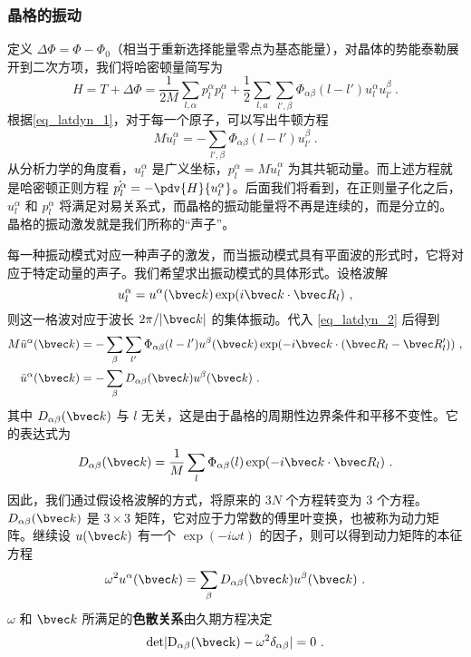 \subsubsection{晶格的振动}
定义 $\Delta \Phi=\Phi-\Phi_0$（相当于重新选择能量零点为基态能量），对晶体的势能泰勒展开到二次方项，我们将哈密顿量简写为
\begin{equation}
H=T+\Delta \Phi=\frac{1}{2M}\sum_{l,\alpha}p_l^\alpha p_l^\alpha + \frac{1}{2}\sum_{l,a}\sum_{l',\beta}\Phi_{\alpha\beta}(l-l')u_l^\alpha u_{l'}^\beta~.
\end{equation}
根据\autoref{eq_latdyn_1}，对于每一个原子，可以写出牛顿方程
\begin{equation}\label{eq_latdyn_2}
M \ddot{u}_l^\alpha = -\sum_{l',\beta}\Phi_{\alpha\beta}(l-l')u_{l'}^\beta~.
\end{equation}
从分析力学的角度看，$u_l^\alpha$ 是广义坐标，$p_l^\alpha=M\dot{u}_l^\alpha$ 为其共轭动量。而上述方程就是哈密顿正则方程 $\dot{p_l^\alpha}=-\pdv{H}{u_l^\alpha}$。后面我们将看到，在正则量子化之后，$u_l^\alpha$ 和 $p_l^\alpha$ 将满足对易关系式，而晶格的振动能量将不再是连续的，而是分立的。晶格的振动激发就是我们所称的“声子”。

每一种振动模式对应一种声子的激发，而当振动模式具有平面波的形式时，它将对应于特定动量的声子。我们希望求出振动模式的具体形式。设格波解
\begin{equation}
u_l^\alpha = u^\alpha(\bvec k) \exp(i\bvec k\cdot \bvec R_l)~,
\end{equation}
则这一格波对应于波长 $2\pi/|\bvec k|$ 的集体振动。代入 \autoref{eq_latdyn_2} 后得到
\begin{equation}
\begin{aligned}
M\ddot{u}^\alpha(\bvec k)&=-\sum_{\beta}\sum_{l'}\Phi_{\alpha\beta}(l-l')u^\beta(\bvec k)\exp(-i\bvec k\cdot(\bvec R_l-\bvec R_l'))~,\\
\ddot{u}^\alpha(\bvec k)&=-\sum_{\beta}D_{\alpha\beta}(\bvec k)u^\beta(\bvec k)~.
\end{aligned}
\end{equation}
其中 $D_{\alpha\beta}(\bvec k)$ 与 $l$ 无关，这是由于晶格的周期性边界条件和平移不变性。它的表达式为
\begin{equation}
D_{\alpha\beta}(\bvec k)=\frac{1}{M}\sum_l \Phi_{\alpha\beta}(l)\exp(-i\bvec k\cdot \bvec R_l)~.
\end{equation}
因此，我们通过假设格波解的方式，将原来的 $3N$ 个方程转变为 $3$ 个方程。$D_{\alpha\beta}(\bvec k)$ 是 $3\times 3$ 矩阵，它对应于力常数的傅里叶变换，也被称为动力矩阵。继续设 $u(\bvec k)$ 有一个 $\exp(-i\omega t)$ 的因子，则可以得到动力矩阵的本征方程
\begin{equation}
\omega^2 u^\alpha(\bvec k)=\sum_{\beta}D_{\alpha\beta}(\bvec k)u^\beta(\bvec k)~.
\end{equation}
$\omega$ 和 $\bvec k$ 所满足的\textbf{色散关系}由久期方程决定
\begin{equation}
\rm{det} |D_{\alpha\beta}(\bvec k)-\omega^2\delta_{\alpha\beta}|=0~.
\end{equation}

